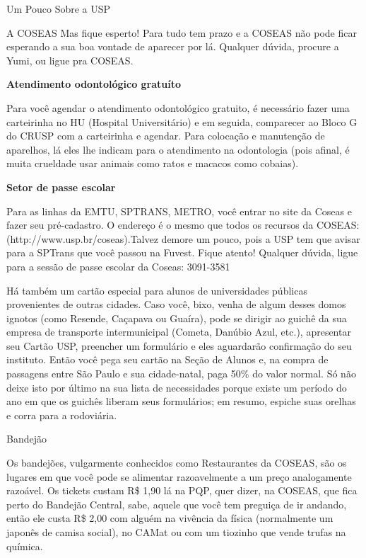\begin{secao}{Um Pouco Sobre a USP}
\begin{subsecao}{A COSEAS}
Mas fique esperto! Para tudo tem prazo e a COSEAS não pode ficar esperando a sua boa vontade de aparecer por lá. Qualquer dúvida, procure a Yumi, ou ligue pra COSEAS.

{\bf Atendimento odontológico gratuíto}

Para você agendar o atendimento odontológico gratuito, é necessário fazer uma carteirinha no HU (Hospital Universitário) e em seguida, comparecer ao Bloco G do CRUSP com a carteirinha e agendar. Para colocação e manutenção de aparelhos, lá eles lhe indicam para o atendimento na odontologia (pois afinal, é muita crueldade usar animais como ratos e macacos como cobaias). 

{\bf Setor de passe escolar}

Para as linhas da EMTU, SPTRANS, METRO, você entrar no site da Coseas e fazer seu pré-cadastro. O endereço é o mesmo que todos os recursos da COSEAS: (http://www.usp.br/coseas).Talvez demore um pouco, pois a USP tem que avisar para a SPTrans que você passou na Fuvest. Fique atento! Qualquer dúvida, ligue para a sessão de passe escolar da Coseas: 3091-3581 

Há também um cartão especial para alunos de universidades públicas provenientes de outras cidades. Caso você, bixo, venha de algum desses domos ignotos (como Resende, Caçapava ou Guaíra), pode se dirigir ao guichê da sua empresa de transporte intermunicipal (Cometa, Danúbio Azul, etc.), apresentar seu Cartão USP, preencher um formulário e eles aguardarão confirmação do seu instituto. Então você pega seu cartão na Seção de Alunos e, na compra de passagens entre São Paulo e sua cidade-natal, paga 50\% do valor normal. Só não deixe isto por último na sua lista de necessidades porque existe um período do ano em que os guichês liberam seus formulários; em resumo, espiche suas orelhas e corra para a rodoviária.

\end{subsecao}

\pagebreak
{}


\begin{subsecao}{Bandejão}

Os bandejões, vulgarmente conhecidos como Restaurantes da COSEAS, são os lugares em que você pode se alimentar razoavelmente a um preço analogamente razoável. Os tickets custam R\$ 1,90 lá na PQP, quer dizer, na COSEAS, que fica perto do Bandejão Central, sabe, aquele que você tem preguiça de ir andando, então ele custa R\$ 2,00 com alguém na vivência da física (normalmente um japonês de camisa social), no CAMat ou com um tiozinho que vende trufas na química.


\end{subsecao}
\end{secao}
